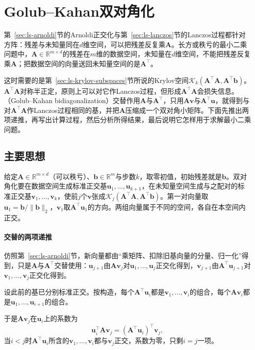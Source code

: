 \section{Golub--Kahan双对角化}
\label{sec:ls-bidiagonal-iteration}

第~\ref{sec:ls-arnoldi}节的Arnoldi正交化与第~\ref{sec:ls-lanczos}节的Lanczos过程都针对方阵：残差与未知量同在$d$维空间，可以把残差反复乘$\bm A$。长方或秩亏的最小二乘问题中，$\bm A\in\mathbb R^{m\times d}$的残差在$m$维的数据空间，未知量在$d$维空间，不能把残差反复乘$\bm A$；把数据空间的向量送回未知量空间的是$\bm A^\top$。

这时需要的是第~\ref{sec:ls-krylov-subspaces}节所说的Krylov空间$\mathcal K_k(\bm A^\top\bm A,\bm A^\top\bm b)$。$\bm A^\top\bm A$对称半正定，原则上可以对它作Lanczos过程，但形成$\bm A^\top\bm A$会损失信息。（Golub--Kahan bidiagonalization）交替作用$\bm A$与$\bm A^\top$，只用$\bm A\bm v$与$\bm A^\top\bm u$，就得到与对$\bm A^\top\bm A$作Lanczos过程相同的基，并把$\bm A$压缩成一个双对角小矩阵。下面先推出两项递推，再写出计算过程，然后分析所得结果，最后说明它怎样用于求解最小二乘问题。

\subsection{主要思想}

给定$\bm A\in\mathbb R^{m\times d}$（可以秩亏）、$\bm b\in\mathbb R^m$与步数$k$，取零初值，初始残差就是$\bm b$。双对角化要在数据空间生成标准正交基$\bm u_1,\ldots,\bm u_{k+1}$，在未知量空间生成与之配对的标准正交基$\bm v_1,\ldots,\bm v_k$，使前$j$个$\bm v$张成$\mathcal K_j(\bm A^\top\bm A,\bm A^\top\bm b)$。第一对向量取$\bm u_1=\bm b/\lVert\bm b\rVert_2$，$\bm v_1$取$\bm A^\top\bm u_1$的方向。两组向量属于不同的空间，各自在本空间内正交。

\paragraph{交替的两项递推}
仿照第~\ref{sec:ls-arnoldi}节，新向量都由“乘矩阵、扣除旧基向量的分量、归一化”得到，只是$\bm A$与$\bm A^\top$交替使用：$\bm u_{j+1}$由$\bm A\bm v_j$对$\bm u_1,\ldots,\bm u_j$正交化得到，$\bm v_{j+1}$由$\bm A^\top\bm u_{j+1}$对$\bm v_1,\ldots,\bm v_j$正交化得到。

设此前的基已分别标准正交。按构造，每个$\bm A^\top\bm u_i$都是$\bm v_1,\ldots,\bm v_i$的组合，每个$\bm A\bm v_i$都是$\bm u_1,\ldots,\bm u_{i+1}$的组合。

于是$\bm A\bm v_j$在$\bm u_i$上的系数为
\[
 \bm u_i^\top\bm A\bm v_j=(\bm A^\top\bm u_i)^\top\bm v_j ,
\]
当$i<j$时$\bm A^\top\bm u_i$所含的$\bm v_1,\ldots,\bm v_i$都与$\bm v_j$正交，系数为零，只剩$i=j$一项。

